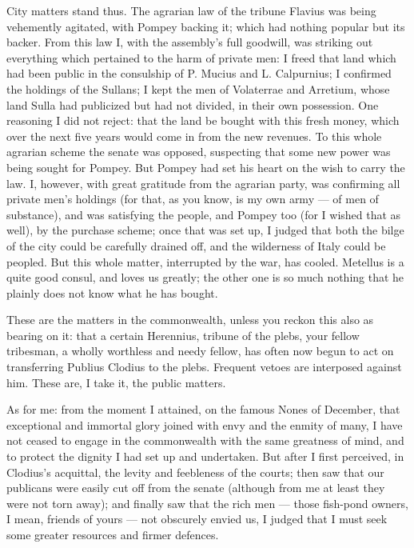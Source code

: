  City matters stand thus. The agrarian law of the tribune Flavius was being vehemently agitated, with Pompey backing it; which had nothing popular but its backer. From this law I, with the assembly's full goodwill, was striking out everything which pertained to the harm of private men: I freed that land which had been public in the consulship of P. Mucius and L. Calpurnius; I confirmed the holdings of the Sullans; I kept the men of Volaterrae and Arretium, whose land Sulla had publicized but had not divided, in their own possession. One reasoning I did not reject: that the land be bought with this fresh money, which over the next five years would come in from the new revenues. To this whole agrarian scheme the senate was opposed, suspecting that some new power was being sought for Pompey. But Pompey had set his heart on the wish to carry the law. I, however, with great gratitude from the agrarian party, was confirming all private men's holdings (for that, as you know, is my own army --- of men of substance), and was satisfying the people, and Pompey too (for I wished that as well), by the purchase scheme; once that was set up, I judged that both the bilge of the city could be carefully drained off, and the wilderness of Italy could be peopled. But this whole matter, interrupted by the war, has cooled. Metellus is a quite good consul, and loves us greatly; the other one is so much nothing that he plainly does not know what he has bought.

 These are the matters in the commonwealth, unless you reckon this also as bearing on it: that a certain Herennius, tribune of the plebs, your fellow tribesman, a wholly worthless and needy fellow, has often now begun to act on transferring Publius Clodius to the plebs. Frequent vetoes are interposed against him. These are, I take it, the public matters.

 As for me: from the moment I attained, on the famous Nones of December, that exceptional and immortal glory joined with envy and the enmity of many, I have not ceased to engage in the commonwealth with the same greatness of mind, and to protect the dignity I had set up and undertaken. But after I first perceived, in Clodius's acquittal, the levity and feebleness of the courts; then saw that our publicans were easily cut off from the senate (although from me at least they were not torn away); and finally saw that the rich men --- those fish-pond owners, I mean, friends of yours --- not obscurely envied us, I judged that I must seek some greater resources and firmer defences.

